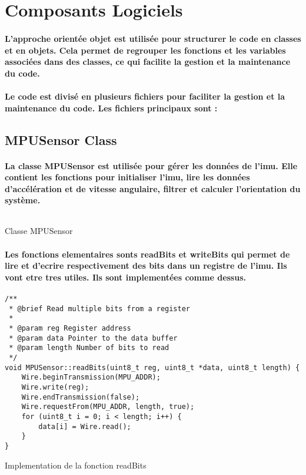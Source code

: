 \section{Composants Logiciels}

\paragraph{L'approche orientée objet est utilisée pour structurer le code en classes et en objets. Cela permet de regrouper les fonctions et les variables associées dans des classes, ce qui facilite la gestion et la maintenance du code.}

\paragraph{Le code est divisé en plusieurs fichiers pour faciliter la gestion et la maintenance du code. Les fichiers principaux sont :}

\subsection{MPUSensor Class}

\paragraph{La classe MPUSensor est utilisée pour gérer les données de l'\gls{imu}. Elle contient les fonctions pour initialiser l'\gls{imu}, lire les données d'accélération et de vitesse angulaire, filtrer et calculer l'orientation du système.}
\begin{listing}[!htpb]
	\inputminted{cpp}{Code/MPUSensor.h}
	\caption{Classe MPUSensor}
	\label{listing:mpu-sensor}
\end{listing}

\paragraph{Les fonctions elementaires sonts readBits et writeBits qui permet de lire et d'ecrire respectivement des bits dans un registre de l'\gls{imu}. Ils vont etre tres utiles. Ils sont implementées comme dessus.}
\begin{listing}[!htpb]
	\begin{verbatim}
/**
 * @brief Read multiple bits from a register
 * 
 * @param reg Register address
 * @param data Pointer to the data buffer
 * @param length Number of bits to read
 */
void MPUSensor::readBits(uint8_t reg, uint8_t *data, uint8_t length) {
	Wire.beginTransmission(MPU_ADDR);
	Wire.write(reg);
	Wire.endTransmission(false);
	Wire.requestFrom(MPU_ADDR, length, true);
	for (uint8_t i = 0; i < length; i++) {
		data[i] = Wire.read();
	}
}
	\end{verbatim}
	\caption{Implementation de la fonction readBits}
	\label{listing:read-bits}
\end{listing}

